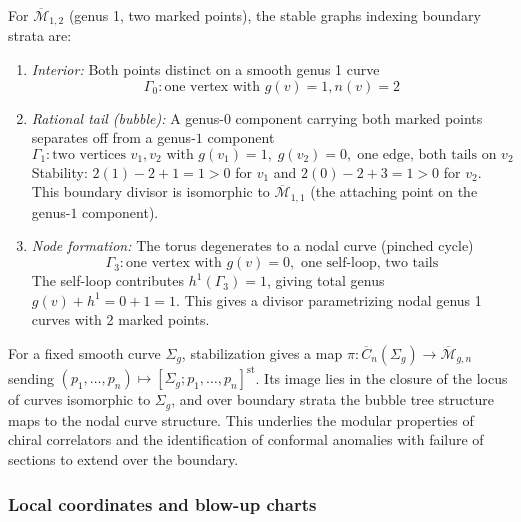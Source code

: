 \begin{example}[Stable graphs at genus 1, \texorpdfstring{$n=2$}{n=2}]\label{ex:stable-graphs-g1-n2}
For $\overline{\mathcal{M}}_{1,2}$ (genus 1, two marked points), the stable graphs indexing boundary strata are:

\begin{enumerate}
\item \emph{Interior:} Both points distinct on a smooth genus 1 curve
\[\Gamma_0: \text{one vertex with } g(v) = 1, n(v) = 2\]

\item \emph{Rational tail (bubble):} A genus-$0$ component carrying both marked points separates off from a genus-$1$ component
\[\Gamma_1: \text{two vertices } v_1, v_2 \text{ with } g(v_1) = 1,\; g(v_2) = 0,\; \text{one edge, both tails on } v_2\]
Stability: $2(1)-2+1 = 1 > 0$ for $v_1$ and $2(0)-2+3 = 1 > 0$ for $v_2$. This boundary divisor is isomorphic to $\overline{\mathcal{M}}_{1,1}$ (the attaching point on the genus-$1$ component).

\item \emph{Node formation:} The torus degenerates to a nodal curve (pinched cycle)
\[\Gamma_3: \text{one vertex with } g(v) = 0, \text{ one self-loop, two tails}\]
The self-loop contributes $h^1(\Gamma_3) = 1$, giving total genus $g(v) + h^1 = 0 + 1 = 1$.
This gives a divisor parametrizing nodal genus 1 curves with 2 marked points.
\end{enumerate}
\end{example}

\begin{remark}\label{rem:moduli-stable-curves}
For a fixed smooth curve $\Sigma_g$, stabilization gives a map $\pi: \overline{C}_n(\Sigma_g) \to \overline{\mathcal{M}}_{g,n}$ sending $(p_1, \ldots, p_n) \mapsto [\Sigma_g; p_1, \ldots, p_n]^{\mathrm{st}}$. Its image lies in the closure of the locus of curves isomorphic to $\Sigma_g$, and over boundary strata the bubble tree structure maps to the nodal curve structure. This underlies the modular properties of chiral correlators and the identification of conformal anomalies with failure of sections to extend over the boundary.
\end{remark}

\subsubsection{Local coordinates and blow-up charts}

